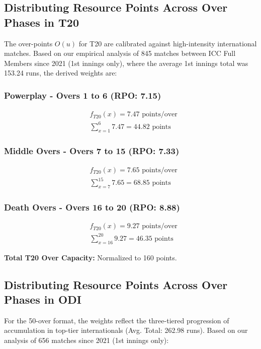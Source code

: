 \documentclass[12pt, letterpaper, fleqn]{article}
\begin{document}
\subsection{Distributing Resource Points Across Over Phases in T20}

\indent The over-points $O(u)$ for T20 are calibrated against high-intensity international matches. Based on our empirical analysis of 845 matches between ICC Full Members since 2021 (1st innings only), where the average 1st innings total was 153.24 runs, the derived weights are:

\subsubsection{Powerplay - Overs 1 to 6 (RPO: 7.15)}
\begin{align*}
& f_{T20}(x) = 7.47 \text{ points/over} \\
& \sum_{x=1}^{6} 7.47 = 44.82 \text{ points}
\end{align*}

\subsubsection{Middle Overs - Overs 7 to 15 (RPO: 7.33)}
\begin{align*}
& f_{T20}(x) = 7.65 \text{ points/over} \\
& \sum_{x=7}^{15} 7.65 = 68.85 \text{ points}
\end{align*}

\subsubsection{Death Overs - Overs 16 to 20 (RPO: 8.88)}
\begin{align*}
& f_{T20}(x) = 9.27 \text{ points/over} \\
& \sum_{x=16}^{20} 9.27 = 46.35 \text{ points}
\end{align*}

\vspace{1em}
\noindent \textbf{Total T20 Over Capacity:} Normalized to 160 points.

\subsection{Distributing Resource Points Across Over Phases in ODI}

\indent For the 50-over format, the weights reflect the three-tiered progression of accumulation in top-tier internationals (Avg. Total: 262.98 runs). Based on our analysis of 656 matches since 2021 (1st innings only):
\end{document}
